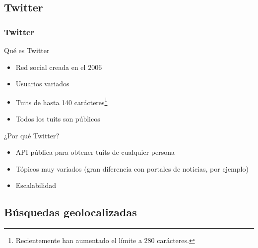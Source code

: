 \subsection{Twitter}
\begin{frame}[t]\frametitle{Twitter}

\begin{block}{Qué es Twitter}
    \begin{itemize}
        \item Red social creada en el 2006
        \item Usuarios variados
        \item Tuits de hasta 140 carácteres{\footnote{Recientemente han aumentado el límite a 280 carácteres.}}
        \item \alert{Todos los tuits son públicos}
    \end{itemize}
\end{block}

\begin{block}{¿Por qué Twitter?}
    \begin{itemize}
        \item API pública para obtener tuits de cualquier persona
        \item Tópicos muy variados (gran diferencia con portales de noticias, por ejemplo)
        \item Escalabilidad
    \end{itemize}
    
\end{block}


\end{frame}

\subsection{Búsquedas geolocalizadas}

